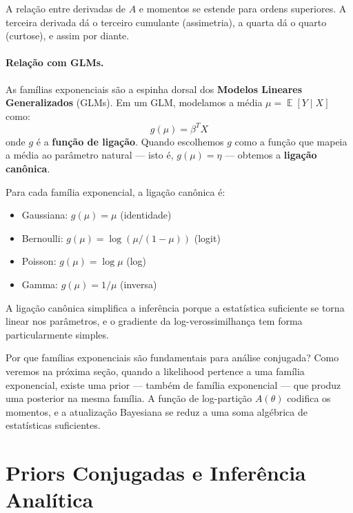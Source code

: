 \documentclass{tufte-handout}
\DeclareMathOperator{\E}{\mathbb{E}}
\begin{document}
\begin{remark}
    A relação entre derivadas de $A$ e momentos se estende para ordens superiores. A terceira derivada dá o terceiro cumulante (assimetria), a quarta dá o quarto (curtose), e assim por diante.
\end{remark}

\paragraph{Relação com GLMs.}

As famílias exponenciais são a espinha dorsal dos \textbf{Modelos Lineares Generalizados} (GLMs). Em um GLM, modelamos a média $\mu = \E[Y \mid X]$ como:
\[
g(\mu) = \beta^T X
\]
onde $g$ é a \textbf{função de ligação}. Quando escolhemos $g$ como a função que mapeia a média ao parâmetro natural --- isto é, $g(\mu) = \eta$ --- obtemos a \textbf{ligação canônica}.

Para cada família exponencial, a ligação canônica é:
\begin{itemize}
    \item Gaussiana: $g(\mu) = \mu$ (identidade)
    \item Bernoulli: $g(\mu) = \log(\mu/(1-\mu))$ (logit)
    \item Poisson: $g(\mu) = \log \mu$ (log)
    \item Gamma: $g(\mu) = 1/\mu$ (inversa)
\end{itemize}

A ligação canônica simplifica a inferência porque a estatística suficiente se torna linear nos parâmetros, e o gradiente da log-verossimilhança tem forma particularmente simples.

\begin{remark}
    Por que famílias exponenciais são fundamentais para análise conjugada? Como veremos na próxima seção, quando a likelihood pertence a uma família exponencial, existe uma prior --- também de família exponencial --- que produz uma posterior na mesma família. A função de log-partição $A(\theta)$ codifica os momentos, e a atualização Bayesiana se reduz a uma soma algébrica de estatísticas suficientes.
\end{remark}

\section{Priors Conjugadas e Inferência Analítica}
\end{document}
